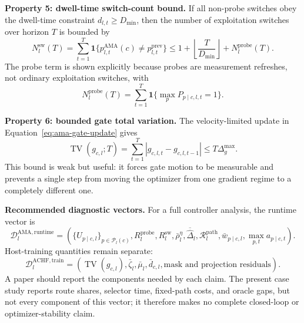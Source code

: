 \documentclass{article}
\begin{document}
\textbf{Property 5: dwell-time switch-count bound.}
If all non-probe switches obey the dwell-time constraint $d_{l,t}\ge D_{\min}$,
then the number of exploitation switches over horizon $T$ is bounded by
\begin{equation}
N^{\mathrm{sw}}_l(T)
=
\sum_{t=1}^{T}
\mathbf{1}\{p^{\mathrm{AMA}}_{l,t}(c)\ne p^{\mathrm{prev}}_{l,t}\}
\le
1+\left\lfloor \frac{T}{D_{\min}}\right\rfloor
+N^{\mathrm{probe}}_l(T).
\label{eq:ama-switch-count-bound}
\end{equation}
The probe term is shown explicitly because probes are measurement refreshes,
not ordinary exploitation switches, with
\begin{equation}
N^{\mathrm{probe}}_l(T)
=
\sum_{t=1}^{T}
\mathbf{1}\{\max_p P_{p\mid c,l,t}=1\}.
\label{eq:ama-probe-count}
\end{equation}

\textbf{Property 6: bounded gate total variation.}
The velocity-limited update in Equation~\eqref{eq:ama-gate-update} gives
\begin{equation}
\operatorname{TV}(g_{c,l};T)
=
\sum_{t=1}^{T}
|g_{c,l,t}-g_{c,l,t-1}|
\le
T\Delta_g^{\max}.
\label{eq:ama-gate-total-variation}
\end{equation}
This bound is weak but useful: it forces gate motion to be measurable and
prevents a single step from moving the optimizer from one gradient regime to a
completely different one.

\textbf{Recommended diagnostic vectors.}
For a full controller analysis, the runtime vector is
\begin{equation}
\mathcal{D}^{\mathrm{AMA,runtime}}_l
=
\left(
\{U_{p\mid c,l}\}_{p\in\mathcal{P}_l(c)},
R^{\mathrm{probe}}_l,
R^{\mathrm{sw}}_l,
\bar{\rho}^{\eta}_l,
\overline{\widehat{\Delta}}_l,
\mathcal{R}^{\mathrm{path}}_l,
\bar{w}_{p\mid c,l},
\max_{p,t} a_{p\mid c,t}
\right).
\label{eq:ama-report-vector}
\end{equation}
Host-training quantities remain separate:
\begin{equation}
\mathcal{D}^{\mathrm{ACHF,train}}_l
=
\left(\operatorname{TV}(g_{c,l}),\bar\zeta_l,\bar\mu_l,
\bar d_{c,l},\text{mask and projection residuals}\right).
\label{eq:achf-training-report-vector}
\end{equation}
A paper should report the components needed by each claim. The present case
study reports route shares, selector time, fixed-path costs, and oracle gaps,
but not every component of this vector; it therefore makes no complete
closed-loop or optimizer-stability claim.
\end{document}
